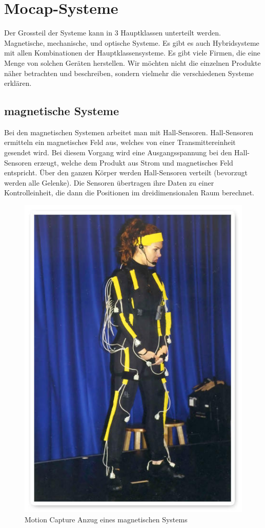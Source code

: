 \chapter{Mocap-Systeme}

Der Grossteil der Systeme kann in 3 Hauptklassen unterteilt werden. Magnetische, mechanische,
und optische Systeme. Es gibt es auch Hybridsysteme mit allen  
Kombinationen der Hauptklassensysteme. Es gibt viele Firmen, die eine Menge von solchen Geräten 
herstellen. Wir möchten nicht die einzelnen Produkte näher betrachten und beschreiben, sondern vielmehr die 
verschiedenen Systeme erklären.

\section{magnetische Systeme}

Bei den magnetischen Systemen arbeitet man mit Hall-Sensoren. Hall-Sensoren ermitteln ein magnetisches Feld aus, welches von einer Transmittereinheit gesendet wird. Bei diesem  Vorgang wird eine Ausgangsspannung bei den Hall-Sensoren erzeugt, welche dem Produkt aus Strom und magnetisches Feld entspricht. Über den ganzen Körper werden Hall-Sensoren verteilt (bevorzugt werden alle Gelenke). Die 
Sensoren übertragen ihre Daten zu einer Kontrolleinheit, die dann die Positionen im dreidimensionalen Raum berechnet.

\begin{figure}[htbp]
\centering
\includegraphics[scale=1]{include/magneticgirl.jpg}
\caption{Motion Capture Anzug eines magnetischen  Systems}
\end{figure}

